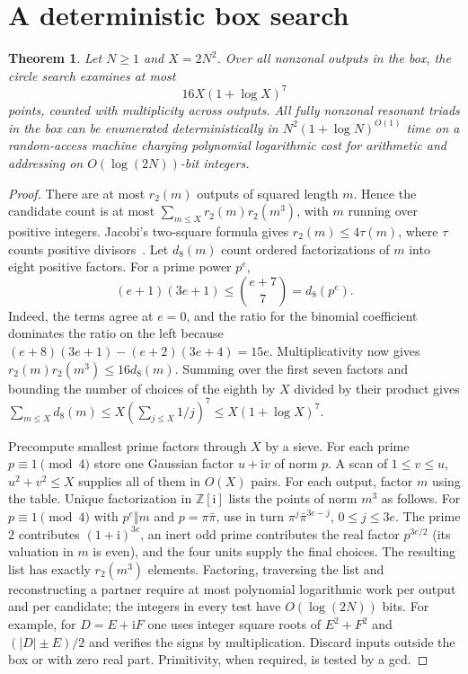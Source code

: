 \documentclass[11pt]{article}
\newtheorem{theorem}{Theorem}
\newcommand{\ZZ}{\mathbb Z}
\newcommand{\ii}{\mathrm i}
\begin{document}
\section{A deterministic box search}
\begin{theorem}\label{th:algorithm}
Let $N\ge1$ and $X=2N^2$. Over all nonzonal outputs in the box, the circle search examines at most
\[
 16X(1+\log X)^7
\]
points, counted with multiplicity across outputs. All fully nonzonal resonant triads in the box can be enumerated deterministically in $N^2(1+\log N)^{O(1)}$ time on a random-access machine charging polynomial logarithmic cost for arithmetic and addressing on $O(\log(2N))$-bit integers.
\end{theorem}
\begin{proof}
There are at most $r_2(m)$ outputs of squared length $m$. Hence the candidate count is at most $\sum_{m\le X}r_2(m)r_2(m^3)$, with $m$ running over positive integers. Jacobi's two-square formula gives $r_2(m)\le4\tau(m)$, where $\tau$ counts positive divisors~\cite[Theorem 278]{HW}. Let $d_8(m)$ count ordered factorizations of $m$ into eight positive factors. For a prime power $p^e$,
\[
 (e+1)(3e+1)\le {e+7\choose7}=d_8(p^e).
\]
Indeed, the terms agree at $e=0$, and the ratio for the binomial coefficient dominates the ratio on the left because $(e+8)(3e+1)-(e+2)(3e+4)=15e$. Multiplicativity now gives $r_2(m)r_2(m^3)\le16d_8(m)$. Summing over the first seven factors and bounding the number of choices of the eighth by $X$ divided by their product gives $\sum_{m\le X}d_8(m)\le X (\sum_{j\le X}1/j)^7\le X(1+\log X)^7$.

Precompute smallest prime factors through $X$ by a sieve. For each prime $p\equiv1\pmod4$ store one Gaussian factor $u+\ii v$ of norm $p$. A scan of $1\le v\le u$, $u^2+v^2\le X$ supplies all of them in $O(X)$ pairs. For each output, factor $m$ using the table. Unique factorization in $\ZZ[\ii]$ lists the points of norm $m^3$ as follows. For $p\equiv1\pmod4$ with $p^e\Vert m$ and $p=\pi\bar\pi$, use in turn $\pi^j\bar\pi^{3e-j}$, $0\le j\le3e$. The prime $2$ contributes $(1+\ii)^{3e}$, an inert odd prime contributes the real factor $p^{3e/2}$ (its valuation in $m$ is even), and the four units supply the final choices. The resulting list has exactly $r_2(m^3)$ elements. Factoring, traversing the list and reconstructing a partner require at most polynomial logarithmic work per output and per candidate; the integers in every test have $O(\log(2N))$ bits. For example, for $D=E+\ii F$ one uses integer square roots of $E^2+F^2$ and $(|D|\pm E)/2$ and verifies the signs by multiplication. Discard inputs outside the box or with zero real part. Primitivity, when required, is tested by a gcd.
\end{proof}
\end{document}
